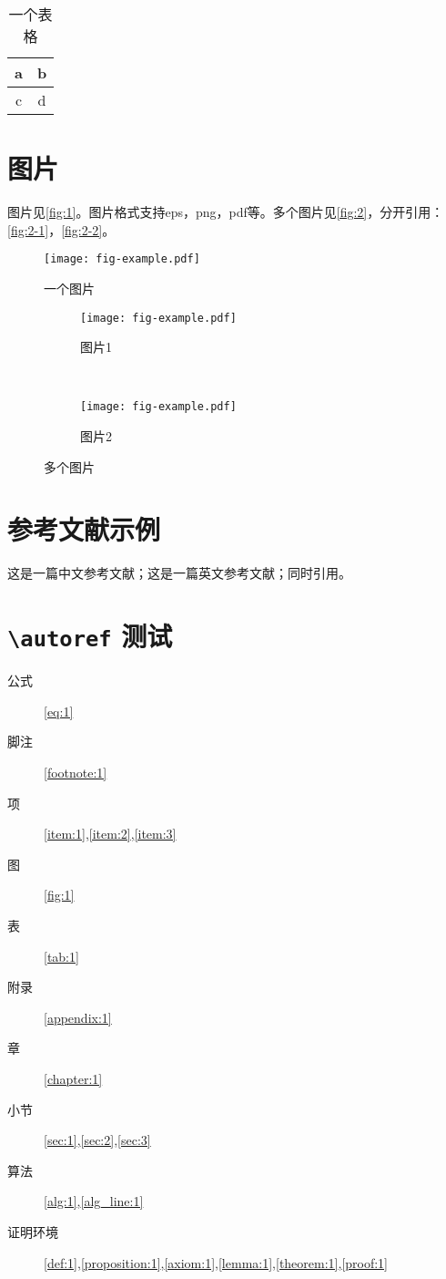 \documentclass[format=draft,language=chinese,degree=master]{hustthesis}
\begin{document}
\begin{table}[!h]
\centering
\caption{一个表格}\label{tab:1}
\begin{tabular}{|c|c|}
\hline
a & b \\
\hline
c & d \\
\hline
\end{tabular}
\end{table}
\section{图片}
图片见\autoref{fig:1}。图片格式支持eps，png，pdf等。多个图片见\autoref{fig:2}，分开引用：\autoref{fig:2-1}，\autoref{fig:2-2}。

\begin{figure}[!h]
\centering
\texttt{[image: fig-example.pdf]}
\caption{一个图片}\label{fig:1}
\end{figure}

\begin{figure}[!h]
\centering
  \begin{subfigure}[b]{0.3\textwidth}
  \texttt{[image: fig-example.pdf]}
  \caption{图片1}\label{fig:2-1}
  \end{subfigure}
  ~
  \begin{subfigure}[b]{0.3\textwidth}
  \texttt{[image: fig-example.pdf]}
  \caption{图片2}\label{fig:2-2}
  \end{subfigure}
\caption{多个图片}\label{fig:2}
\end{figure}

\section{参考文献示例}
这是一篇中文参考文献\cite{徐媛媛2003嵌入式实时操作系统的设备驱动}；这是一篇英文参考文献\cite{9787508342894}；同时引用\cite{9780124467422,bamboosilk}。

\section[\textbackslash{}autoref 测试]{\texttt{\textbackslash{}autoref} 测试}

\begin{description}
  \item[公式] \autoref{eq:1}
  \item[脚注] \autoref{footnote:1}
  \item[项] \autoref{item:1},\autoref{item:2},\autoref{item:3}
  \item[图] \autoref{fig:1}
  \item[表] \autoref{tab:1}
  \item[附录] \autoref{appendix:1}
  \item[章] \autoref{chapter:1}
  \item[小节] \autoref{sec:1},\autoref{sec:2},\autoref{sec:3}
  \item[算法] \autoref{alg:1},\autoref{alg_line:1}
  \item[证明环境] \autoref{def:1},\autoref{proposition:1},\autoref{axiom:1},\autoref{lemma:1},\autoref{theorem:1},\autoref{proof:1}
\end{description}
\end{document}
